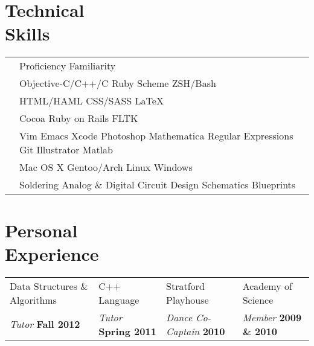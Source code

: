 \documentclass[margin,line]{res}
\begin{document}
{\begin{resume}
{      \section{\sc Technical \\ Skills}} 
    \hspace{-.30in}
    {\renewcommand{\arraystretch}{.6}
      \renewcommand{\tabcolsep}{0.2cm}
      \begin{tabular}{@{}p{1.528in}p{5.8in}}
        & {\color{Black} Proficiency} {\color{Black!20!White} Familiarity}\\
        & {\color{Black} Objective-C/C++/C } {\color{Black} Ruby } {\color{Black} Scheme } {\color{Black!20!White} ZSH/Bash} \\            
        & {\color{Black} HTML/HAML }  {\color{Black} CSS/SASS }  {\color{Black} \LaTeX{}}\\
        & {\color{Black} Cocoa}  {\color{Black!60!White} Ruby on Rails}  {\color{Black!20!White} FLTK }\\
        & {\color{Black} Vim }  {\color{Black} Emacs } {\color{Black} Xcode }  {\color{Black!60!White} Photoshop }  {\color{Black!40!White} Mathematica }  {\color{Black!60!White} Regular Expressions } {\color{Black!40!White} Git }  {\color{Black!20!White} Illustrator }  {\color{Black!20!White} Matlab }\\
        & {\color{Black} Mac OS X }  {\color{Black} Gentoo/Arch Linux }  {\color{Black!30!White} Windows }\\
        & {\color{Black} Soldering }  {\color{Black} Analog \& Digital Circuit Design } {\color{Black} Schematics}  {\color{Black!60!White} Blueprints}\\       
      \end{tabular}}

    {\color{WildStrawberry}
      \section{\sc Personal \\ Experience}}
    \color{black}
    \hspace{-.13in}
    \begin{tabular}{l l l l}
      Data Structures \& Algorithms & C++ Language            & Stratford Playhouse & Academy of Science \\
      {\em Tutor} \bf Fall 2012         & {\em Tutor} \bf Spring 2011
      & {\em Dance Co-Captain} \bf 2010 & {\em Member} \bf 2009 \& 2010 \\
    \end{tabular}


\end{resume}}
\end{document}
